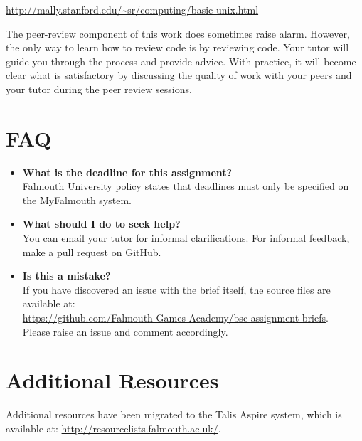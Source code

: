 \documentclass{../../fal_assignment}
\begin{document}
\url{http://mally.stanford.edu/~sr/computing/basic-unix.html}

The peer-review component of this work does sometimes raise alarm. However, the only way to learn how to review code is by reviewing code. Your tutor will guide you through the process and provide advice. With practice, it will become clear what is satisfactory by discussing the quality of work with your peers and your tutor during the peer review sessions. 

\section*{FAQ}

\begin{itemize}
	\item 	\textbf{What is the deadline for this assignment?} \\ 
    		Falmouth University policy states that deadlines must only be specified on the MyFalmouth system.
    		
	\item 	\textbf{What should I do to seek help?} \\ 
    		You can email your tutor for informal clarifications. For informal feedback, make a pull request on GitHub. 
    		
    	\item 	\textbf{Is this a mistake?} \\ 	
    		If you have discovered an issue with the brief itself, the source files are available at: \\
    		\url{https://github.com/Falmouth-Games-Academy/bsc-assignment-briefs}.\\
    		 Please raise an issue and comment accordingly.
\end{itemize}

\section*{Additional Resources}

Additional resources have been migrated to the Talis Aspire system, which is available at: \url{http://resourcelists.falmouth.ac.uk/}.

\rubricyeartwo
\end{document}
